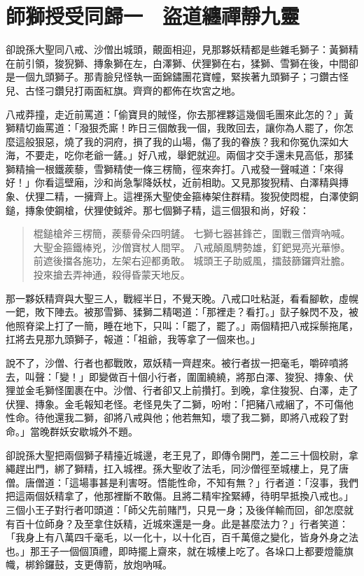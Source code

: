 
\chapter{師獅授受同歸一　盜道纏禪靜九靈}

卻說孫大聖同八戒、沙僧出城頭，覿面相迎，見那夥妖精都是些雜毛獅子：黃獅精在前引領，狻猊獅、摶象獅在左，白澤獅、伏狸獅在右，猱獅、雪獅在後，中間卻是一個九頭獅子。那青臉兒怪執一面錦鏽團花寶幢，緊挨著九頭獅子；刁鑽古怪兒、古怪刁鑽兒打兩面紅旗。齊齊的都佈在坎宮之地。

八戒莽撞，走近前罵道：「偷寶貝的賊怪，你去那裡夥這幾個毛團來此怎的？」黃獅精切齒罵道：「潑狠禿廝！昨日三個敵我一個，我敗回去，讓你為人罷了，你怎麼這般狠惡，燒了我的洞府，損了我的山場，傷了我的眷族？我和你冤仇深如大海，不要走，吃你老爺一鏟。」好八戒，舉鈀就迎。兩個才交手還未見高低，那猱獅精掄一根鐵蒺藜，雪獅精使一條三楞簡，徑來奔打。八戒發一聲喊道：「來得好！」你看這壁廂，沙和尚急掣降妖杖，近前相助。又見那狻猊精、白澤精與摶象、伏狸二精，一擁齊上。這裡孫大聖使金箍棒架住群精。狻猊使悶棍，白澤使銅鎚，摶象使鋼槍，伏狸使鉞斧。那七個獅子精，這三個狠和尚，好殺：
\begin{quote}
棍鎚槍斧三楞簡，蒺藜骨朵四明鏟。
七獅七器甚鋒芒，圍戰三僧齊吶喊。
大聖金箍鐵棒兇，沙僧寶杖人間罕。
八戒顛風騁勢雄，釘鈀晃亮光華慘。
前遮後擋各施功，左架右迎都勇敢。
城頭王子助威風，擂鼓篩鑼齊壯膽。
投來搶去弄神通，殺得昏蒙天地反。
\end{quote}

那一夥妖精齊與大聖三人，戰經半日，不覺天晚。八戒口吐粘涎，看看腳軟，虛幌一鈀，敗下陣去。被那雪獅、猱獅二精喝道：「那裡走？看打。」獃子躲閃不及，被他照脊梁上打了一簡，睡在地下，只叫：「罷了，罷了。」兩個精把八戒採鬃拖尾，扛將去見那九頭獅子，報道：「祖爺，我等拿了一個來也。」

說不了，沙僧、行者也都戰敗，眾妖精一齊趕來。被行者拔一把毫毛，嚼碎噴將去，叫聲：「變！」即變做百十個小行者，圍圍繞繞，將那白澤、狻猊、摶象、伏狸並金毛獅怪圍裹在中。沙僧、行者卻又上前攢打。到晚，拿住狻猊、白澤，走了伏狸、摶象。金毛報知老怪。老怪見失了二獅，吩咐：「把豬八戒綑了，不可傷他性命。待他還我二獅，卻將八戒與他；他若無知，壞了我二獅，即將八戒殺了對命。」當晚群妖安歇城外不題。

卻說孫大聖把兩個獅子精擡近城邊，老王見了，即傳令開門，差二三十個校尉，拿繩趕出門，綁了獅精，扛入城裡。孫大聖收了法毛，同沙僧徑至城樓上，見了唐僧。唐僧道：「這場事甚是利害呀。悟能性命，不知有無？」行者道：「沒事，我們把這兩個妖精拿了，他那裡斷不敢傷。且將二精牢拴緊縛，待明早抵換八戒也。」三個小王子對行者叩頭道：「師父先前賭鬥，只見一身；及後佯輸而回，卻怎麼就有百十位師身？及至拿住妖精，近城來還是一身。此是甚麼法力？」行者笑道：「我身上有八萬四千毫毛，以一化十，以十化百，百千萬億之變化，皆身外身之法也。」那王子一個個頂禮，即時擺上齋來，就在城樓上吃了。各垛口上都要燈籠旗幟，梆鈴鑼鼓，支更傳箭，放炮吶喊。

